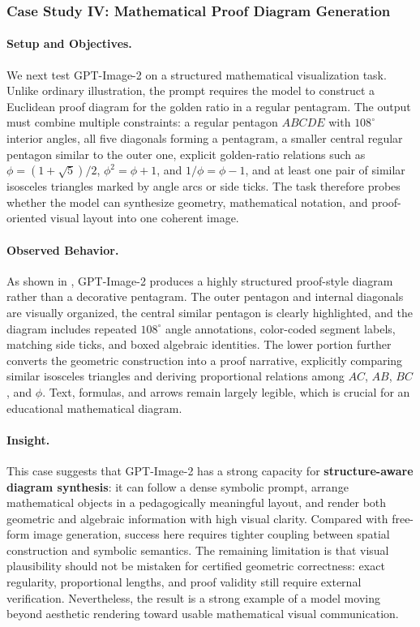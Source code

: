 \documentclass{llmxive}
\begin{document}
\subsubsection{Case Study IV: Mathematical Proof Diagram Generation}

\paragraph{Setup and Objectives.}
We next test GPT-Image-2 on a structured mathematical visualization task. Unlike ordinary illustration, the prompt requires the model to construct a Euclidean proof diagram for the golden ratio in a regular pentagram. The output must combine multiple constraints: a regular pentagon $ABCDE$ with $108^\circ$ interior angles, all five diagonals forming a pentagram, a smaller central regular pentagon similar to the outer one, explicit golden-ratio relations such as $\phi=(1+\sqrt{5})/2$, $\phi^2=\phi+1$, and $1/\phi=\phi-1$, and at least one pair of similar isosceles triangles marked by angle arcs or side ticks. The task therefore probes whether the model can synthesize geometry, mathematical notation, and proof-oriented visual layout into one coherent image.

\paragraph{Observed Behavior.}
As shown in , GPT-Image-2 produces a highly structured proof-style diagram rather than a decorative pentagram. The outer pentagon and internal diagonals are visually organized, the central similar pentagon is clearly highlighted, and the diagram includes repeated $108^\circ$ angle annotations, color-coded segment labels, matching side ticks, and boxed algebraic identities. The lower portion further converts the geometric construction into a proof narrative, explicitly comparing similar isosceles triangles and deriving proportional relations among $AC$, $AB$, $BC$, and $\phi$. Text, formulas, and arrows remain largely legible, which is crucial for an educational mathematical diagram.

\paragraph{Insight.}
This case suggests that GPT-Image-2 has a strong capacity for \textbf{structure-aware diagram synthesis}: it can follow a dense symbolic prompt, arrange mathematical objects in a pedagogically meaningful layout, and render both geometric and algebraic information with high visual clarity. Compared with free-form image generation, success here requires tighter coupling between spatial construction and symbolic semantics. The remaining limitation is that visual plausibility should not be mistaken for certified geometric correctness: exact regularity, proportional lengths, and proof validity still require external verification. Nevertheless, the result is a strong example of a model moving beyond aesthetic rendering toward usable mathematical visual communication.
\end{document}
